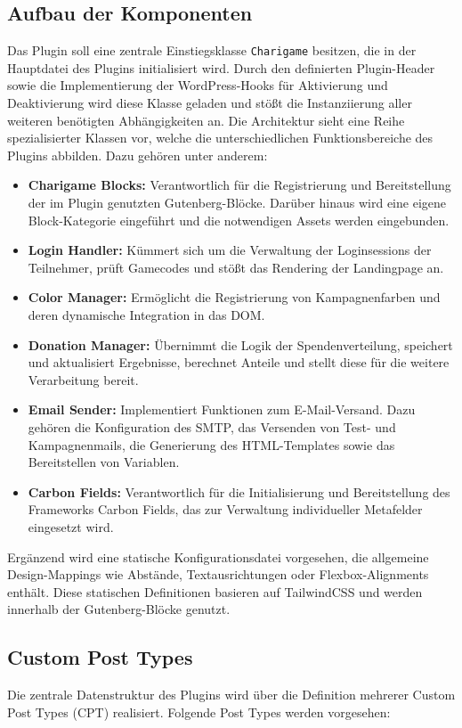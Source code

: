 \subsection{Aufbau der Komponenten}
Das Plugin soll eine zentrale Einstiegsklasse \texttt{Charigame} besitzen, die in der Hauptdatei des Plugins initialisiert wird.
Durch den definierten Plugin-Header sowie die Implementierung der WordPress-Hooks für Aktivierung und Deaktivierung wird diese Klasse geladen und stößt die Instanziierung aller weiteren benötigten Abhängigkeiten an.
Die Architektur sieht eine Reihe spezialisierter Klassen vor, welche die unterschiedlichen Funktionsbereiche des Plugins abbilden.
Dazu gehören unter anderem:

\begin{itemize}
    \item \textbf{Charigame Blocks:} Verantwortlich für die Registrierung und Bereitstellung der im Plugin genutzten Gutenberg-Blöcke.
    Darüber hinaus wird eine eigene Block-Kategorie eingeführt und die notwendigen Assets werden eingebunden.
    \item \textbf{Login Handler:} Kümmert sich um die Verwaltung der Loginsessions der Teilnehmer, prüft Gamecodes und stößt das Rendering der Landingpage an.
    \item \textbf{Color Manager:} Ermöglicht die Registrierung von Kampagnenfarben und deren dynamische Integration in das DOM.
    \item \textbf{Donation Manager:} Übernimmt die Logik der Spendenverteilung, speichert und aktualisiert Ergebnisse, berechnet Anteile und stellt diese für die weitere Verarbeitung bereit.
    \item \textbf{Email Sender:} Implementiert Funktionen zum E-Mail-Versand.
    Dazu gehören die Konfiguration des SMTP, das Versenden von Test- und Kampagnenmails, die Generierung des HTML-Templates sowie das Bereitstellen von Variablen.
    \item \textbf{Carbon Fields:} Verantwortlich für die Initialisierung und Bereitstellung des Frameworks Carbon Fields, das zur Verwaltung individueller Metafelder eingesetzt wird.
\end{itemize}

Ergänzend wird eine statische Konfigurationsdatei vorgesehen, die allgemeine Design-Mappings wie Abstände, Textausrichtungen oder Flexbox-Alignments enthält.
Diese statischen Definitionen basieren auf TailwindCSS und werden innerhalb der Gutenberg-Blöcke genutzt.
\newpage
\subsection{Custom Post Types}
Die zentrale Datenstruktur des Plugins wird über die Definition mehrerer Custom Post Types (\gls{CPT}) realisiert.
Folgende Post Types werden vorgesehen:

